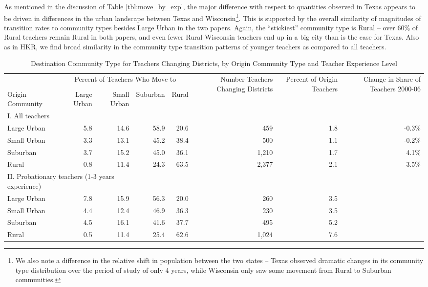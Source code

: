 \documentclass[]{article}
\let\rmarkdownfootnote\footnote%
\def\footnote{\protect\rmarkdownfootnote}
\begin{document}
As mentioned in the discussion of Table \ref{tbl:move_by_exp}, the major
difference with respect to quantities observed in Texas appears to be
driven in differences in the urban landscape between Texas and
Wisconsin\footnote{We also note a difference in the relative shift in
  population between the two states -- Texas observed dramatic changes
  in its community type distribution over the period of study of only 4
  years, while Wisconsin only saw some movement from Rural to Suburban
  communities.}. This is supported by the overall similarity of
magnitudes of transition rates to community types besides Large Urban in
the two papers. Again, the ``stickiest'' community type is Rural -- over
60\% of Rural teachers remain Rural in both papers, and even fewer Rural
Wisconsin teachers end up in a big city than is the case for Texas. Also
as in HKR, we find broad similarity in the community type transition
patterns of younger teachers as compared to all teachers.

\begin{sidewaystable}[ht]
\centering
\begin{tabular}{lrrrrrrr}
  \hline
 & \multicolumn{4}{c}{\multirow{2}{*}{Percent of Teachers Who Move to}} & \multirow{4}{*}{\parbox{0.09\linewidth}{Number Teachers Changing Districts}} & \multirow{4}{*}{\parbox{0.07\linewidth}{Percent of Origin Teachers}} & \multirow{4}{*}{\parbox{0.07\linewidth}{Change in Share of Teachers 2000-06}}\\
 & \multicolumn{4}{c}{} & & & \\ \cline{2-5}
& & & & & & & \\
Origin Community & Large Urban & Small Urban & Suburban & Rural &  &  &  \\ 
  \hline
I. All teachers & & & & & & & \\
\quad Large Urban & 5.8 & 14.6 & 58.9 & 20.6 & 459 & 1.8 & -0.3\% \\ 
  \quad Small Urban & 3.3 & 13.1 & 45.2 & 38.4 & 500 & 1.1 & -0.2\% \\ 
  \quad Suburban & 3.7 & 15.2 & 45.0 & 36.1 & 1,210 & 1.7 & 4.1\% \\ 
  \quad Rural & 0.8 & 11.4 & 24.3 & 63.5 & 2,377 & 2.1 & -3.5\% \\ 
\multicolumn{3}{l}{II. Probationary teachers (1-3 years experience)} & & & & & \\
  \quad Large Urban & 7.8 & 15.9 & 56.3 & 20.0 & 260 & 3.5 &  \\ 
  \quad Small Urban & 4.4 & 12.4 & 46.9 & 36.3 & 230 & 3.5 &  \\ 
  \quad Suburban & 4.5 & 16.1 & 41.6 & 37.7 & 495 & 5.2 &  \\ 
  \quad Rural & 0.5 & 11.4 & 25.4 & 62.6 & 1,024 & 7.6 &  \\ 
   \hline
\end{tabular}
\caption{Destination Community Type for Teachers Changing Districts, by Origin Community Type and Teacher Experience Level} 
\label{tbl:markov}
\end{sidewaystable}
\end{document}
